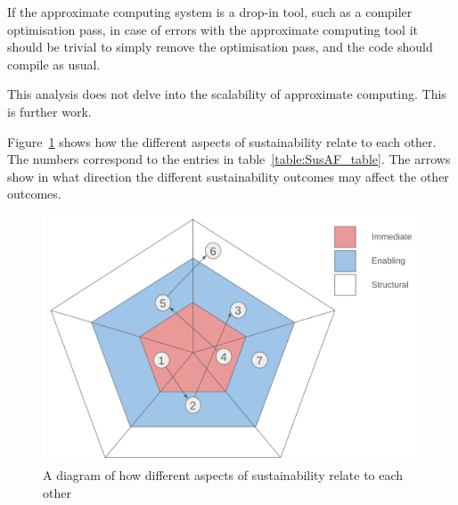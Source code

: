 If the approximate computing system is a drop-in tool, such as a compiler optimisation pass, in case of errors with the approximate computing tool it should be trivial to simply remove the optimisation pass, and the code should compile as usual.

This analysis does not delve into the scalability of approximate computing. This is further work.



Figure~\ref{fig:SusAF_diagram} shows how the different aspects of sustainability relate to each other. The numbers correspond to the entries in table~\ref{table:SusAF_table}. The arrows show in what direction the different sustainability outcomes may affect the other outcomes.


\begin{figure}
    \centering
    \includegraphics[width=0.5\linewidth]{Images/SusAF_diagram.png}
    \caption{A diagram of how different aspects of sustainability relate to each other}
    \label{fig:SusAF_diagram}
\end{figure}